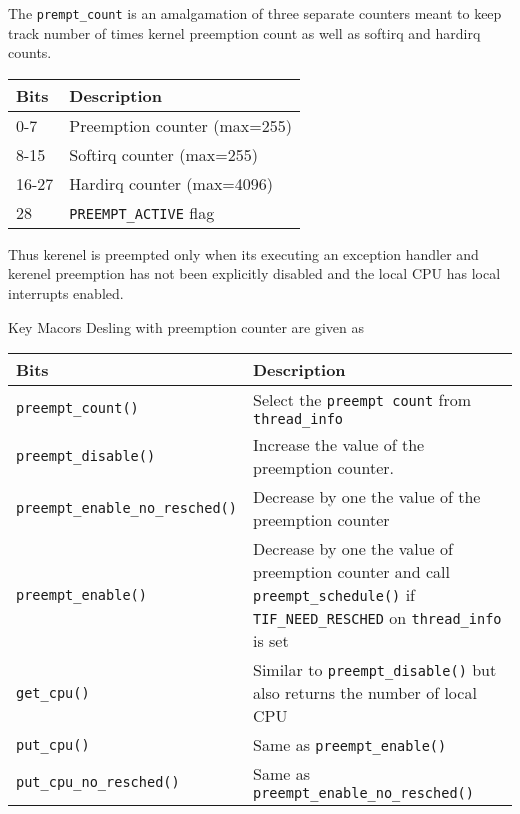 \documentclass{article}
\begin{document}
The \lstinline{prempt_count} is an amalgamation of three separate
counters meant to keep track number of times kernel preemption count
as well as softirq and hardirq counts.


\begin{center}
  \begin{tabular}{ l | l }    
    \hline
    Bits & Description                    \\ \hline
    0-7 & Preemption counter (max=255)    \\ 
    8-15 & Softirq counter (max=255)      \\ 
    16-27 &  Hardirq counter (max=4096)   \\ 
    28 & \lstinline{PREEMPT_ACTIVE} flag  \\ \hline
  \end{tabular}
\end{center}

Thus kerenel is preempted only when its executing an exception handler
and kerenel preemption has not been explicitly disabled and the local
CPU has local interrupts enabled.

Key Macors Desling with preemption counter are given as 

\begin{center}
  \begin{tabular}{ l | p{9 cm} }    
    \hline
    Bits & Description                    \\ \hline
    \lstinline{preempt_count()} & Select the \lstinline{preempt count} from \lstinline{thread_info}    \\ 
    \lstinline{preempt_disable()} & Increase the value of the preemption counter.     \\ 
    \lstinline{preempt_enable_no_resched()} &  Decrease by one the value of the preemption counter  \\
    \lstinline{preempt_enable()} & Decrease by one the value of preemption counter and call \lstinline{preempt_schedule()} if \lstinline{TIF_NEED_RESCHED} on \lstinline{thread_info} is set \\
    \lstinline{get_cpu()} & Similar to \lstinline{preempt_disable()} but also returns the number of local CPU \\
    \lstinline{put_cpu()} & Same as  \lstinline{preempt_enable()} \\
    \lstinline{put_cpu_no_resched()} & Same as \lstinline{preempt_enable_no_resched()}    \\
    \hline
  \end{tabular}
\end{center}
\end{document}
